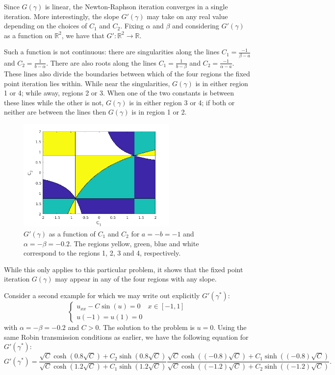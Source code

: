 \documentclass{article}
\begin{document}
Since $G(\gamma)$ is linear, the Newton-Raphson iteration converges in a single iteration.
More interestingly, the slope $G'(\gamma)$ may take on any real value depending on the choices of $C_1$ and $C_2$.
Fixing $\alpha$ and $\beta$ and considering $G'(\gamma)$ as a function on $\mathbb{R}^2$, we have that $G':\mathbb{R}^2 \rightarrow \mathbb{R}$.

Such a function is not continuous: there are singularities along the lines $C_1 = \frac{-1}{\beta-a}$ and $C_2 = \frac{1}{b-\alpha}$.
There are also roots along the lines $C_1 = \frac{1}{b-\beta}$ and $C_2 = \frac{-1}{\alpha-a}$.
These lines also divide the boundaries between which of the four regions the fixed point iteration lies within.
While near the singularities, $G(\gamma)$ is in either region 1 or 4; while away, regions 2 or 3.
When one of the two constants is between these lines while the other is not, $G(\gamma)$ is in either region 3 or 4; if both or neither are between the lines then $G(\gamma)$ is in region 1 or 2.

\begin{figure}
\centering
\includegraphics[width=0.7\textwidth]{exp9_01.png}
\caption{$G'(\gamma)$ as a function of $C_1$ and $C_2$ for $a = -b = -1$ and $\alpha = -\beta = -0.2$.
The regions yellow, green, blue and white correspond to the regions 1, 2, 3 and 4, respectively.}
\end{figure}

While this only applies to this particular problem, it shows that the fixed point iteration $G(\gamma)$ may appear in any of the four regions with any slope.

Consider a second example for which we may write out explicitly $G'(\gamma^*)$:
\begin{equation*}
\begin{cases} u_{xx} - C \sin(u) = 0 & x \in [-1,1] \\ u(-1) = u(1) = 0 \end{cases}
\end{equation*}
with $\alpha = -\beta = -0.2$ and $C>0$.
The solution to the problem is $u=0$.
Using the same Robin transmission conditions as earlier, we have the following equation for $G'(\gamma^*)$:
\begin{equation*}
G'(\gamma^*) = \frac{\sqrt{C} \cosh(0.8 \sqrt{C}) + C_2 \sinh (0.8 \sqrt{C})}{\sqrt{C} \cosh(1.2 \sqrt{C}) + C_1 \sinh(1.2 \sqrt{C})} \frac{\sqrt{C} \cosh((-0.8) \sqrt{C}) + C_1 \sinh ((-0.8) \sqrt{C})}{\sqrt{C} \cosh((-1.2) \sqrt{C}) + C_2 \sinh((-1.2) \sqrt{C})} .
\end{equation*}
\end{document}
